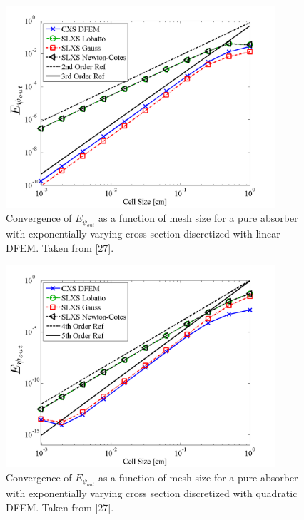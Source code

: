 %
\begin{figure}[!htp]
\centering
\includegraphics[width=10cm]{chapter3_variable_xs/P1_VarXS_E_psi_out.png}
\caption{Convergence of $E_{\psi_{out}}$  as a function of mesh size for a pure absorber with exponentially varying cross section discretized with linear DFEM.  Taken from [27].}
\label{fig:varxs_psi_out_p1}
\end{figure}
%
%
\begin{figure}[!hbp]
\centering
\includegraphics[width=10cm]{chapter3_variable_xs/P2_VarXS_E_psi_out.png}
\caption{Convergence of $E_{\psi_{out}}$  as a function of mesh size for a pure absorber with exponentially varying cross section discretized with quadratic DFEM.  Taken from [27].}
\label{fig:varxs_psi_out_p2}
\end{figure}
%



